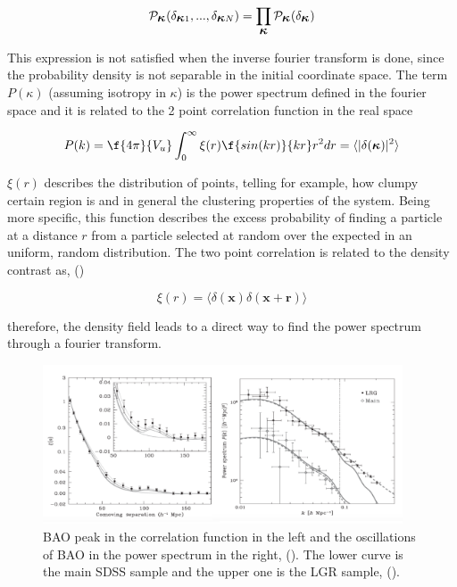 \documentclass[a4,useAMS,usegraphicx,12pt]{article}
\begin{document}
\[
\mathcal{P}_{\mbox{\boldmath$\kappa$}}(\delta_{\mbox{\boldmath$\kappa$}1},...,\delta_{\mbox{\boldmath$\kappa$}N})=
\prod_{\mbox{\boldmath$\kappa$}}\mathcal{P}_{\mbox{\boldmath$\kappa$}}(\delta_{\mbox{\boldmath$\kappa$}})
\]

This expression is not satisfied when the inverse fourier transform is done, since the probability density is 
not separable in the initial coordinate space. The term $P(\kappa)$ (assuming isotropy in \mbox{\boldmath$\kappa$}) is the power spectrum 
defined in the fourier space and it is related to the 2 point correlation function in the real space

\begin{equation}
P(k) = \f{4\pi}{V_u}\int_0^\infty \xi (r)\f{sin(kr)}{kr}r^2dr =  \langle|\delta(\mbox{\boldmath$\kappa$})|^2\rangle
\label{pk}
\end{equation}

$\xi (r)$  describes the distribution of points, telling for example, how clumpy certain region is and in general the clustering 
properties of the system. Being more specific, this function describes the excess probability of finding a particle 
at a distance $r$ from a particle selected at random over the expected in an uniform, random distribution. 
The two point correlation is related to the density contrast as, (\cite{Longair})

\[\xi (r) =  \langle  \delta(\textbf{x})\delta(\textbf{x}+\textbf{r}) \rangle\]

therefore, the density field leads to a direct way to find the power spectrum through a fourier transform. 

\begin{figure}[htbp]
       \centering
               \includegraphics[width=0.95\textwidth]{Images/PS_CF.png}
       \caption{\small BAO peak in the correlation function in the left and the oscillations of BAO in the power spectrum in the right,
       (\cite{PLOT}).  
       The lower curve is the main SDSS sample and the upper one is the LGR sample, (\cite{PLOT2}). }
       \label{ps_cf}
 \end{figure}
\end{document}

